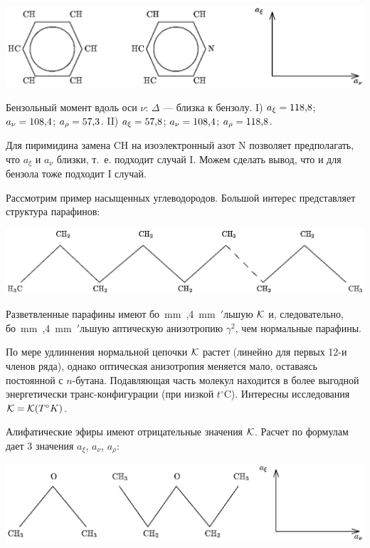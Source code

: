 
\centerline{\hbox{\includegraphics[scale=0.69]{Ris/ris_eps/eff_kerr/benz.eps}}}


\noindent Бензольный момент вдоль оси $\nu$: $\Delta$ --- близка к бензолу.
I) $a_{\xi}=\hbox{118,8}$; $a_{\nu}=\hbox{108,4}$; $a_{\rho}=\hbox{57,3}$.
II) $a_{\xi}=\hbox{57,8}$; $a_{\nu}=\hbox{108,4}$; $a_{\rho}=\hbox{118,8}$.\par
Для пиримидина замена CH на изоэлектронный азот N позволяет
предполагать, что $a_{\xi}$ и $a_{\nu}$ близки, т.~е.
подходит случай I. Можем сделать вывод, что и для бензола тоже
подходит I случай.\par
Рассмотрим пример насыщенных углеводородов.
Большой интерес представляет структура парафинов:

\centerline{\hbox{\includegraphics[scale=0.69]{Ris/ris_eps/eff_kerr/paraf.eps}}}

Разветвленные парафины имеют \hbox{бо  mm ,4 mm
\hbox{$'$}льшую} $\cal K$ и, следовательно,
\hbox{бо  mm ,4 mm
\hbox{$'$}льшую} аптическую анизотропию $\gamma^2$, чем нормальные
парафины. \eject \par По мере удлиннения нормальной  цепочки $\cal K$ растет
(линейно для первых 12-и членов ряда), однако оптическая
анизотропия меняется мало, оставаясь постоянной с $n$-бутана.
Подавляющая часть молекул находится в более выгодной
энергетически транс-конфигурации (при низкой $t^{\circ}$C).
Интересны исследования $\cal K=K(\mit T^{\circ}K)$.
\par Алифатические эфиры имеют отрицательные значения $\cal K$.
Расчет по формулам дает 3 значения $a_{\xi}$, $a_{\nu}$,
$a_{\rho}$:

\centerline{\hbox{\includegraphics[scale=0.69]{Ris/ris_eps/eff_kerr/alif.eps}}}

